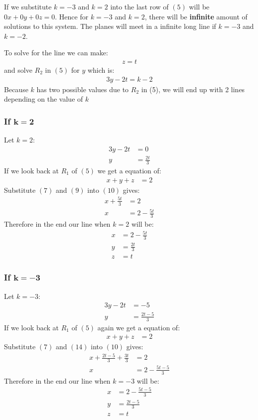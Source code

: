 \documentclass[11pt]{article}
\begin{document}
If we substitute  $k = -3$ and $k =2$ into the last row of $(5)$
will be $0x + 0y + 0z = 0$. Hence for  $k = -3$ and $k =2$, there will be {\bf infinite} amount of solutions to this system. The planes will meet in a infinite long line if $k = -3$ and $k =-2$.

To solve for the line we can make:
\begin{align}
z=t
\end{align}
and solve $R_2$ in $(5)$ for $y$ which is:
\begin{align*}
3y-2t=k-2
\end{align*}
Because $k$ has two possible values due to $R_2$ in (5), we will end up with 2 lines depending on the value of $k$ \\
\subsubsection{If $\bm{k=2}$}
Let $k = 2$:
\begin{align}
3y-2t&=0 \\
y&=\frac{2t}{3}
\end{align}
If we look back at $R_1$ of $(5)$ we get a equation of:
\begin{align}
x+y+z&=2
\end{align}
Substitute $(7)$ and $(9)$ into $(10)$ gives:
\begin{align}
x+\frac{5t}{3}&=2 \\
x&= 2 -\frac{5t}{3}
\end{align}
Therefore in the end our line when $k = 2$ will be:
\begin{align*}
x&=2-\frac{5t}{3} \\
y&=\frac{2t}{3} \\ 
z&=t
\end{align*}

\newpage

\subsubsection{If $\bm{k=-3}$}
Let $k = -3$:
\begin{align}
3y-2t&=-5 \\
y&=\frac{2t-5}{3}
\end{align}
If we look back at $R_1$ of $(5)$ again we get a equation of:
\begin{align*}
x+y+z&=2
\end{align*}
Substitute $(7)$ and $(14)$ into $(10)$ gives:
\begin{align}
x+\frac{2t-5}{3}+\frac{3t}{3}&=2 \\
x&= 2 -\frac{5t-5}{3}
\end{align}
Therefore in the end our line when $k = -3$ will be:
\begin{align*}
x&=2-\frac{5t-5}{3} \\
y&=\frac{2t-5}{3} \\ 
z&=t
\end{align*}
\end{document}
